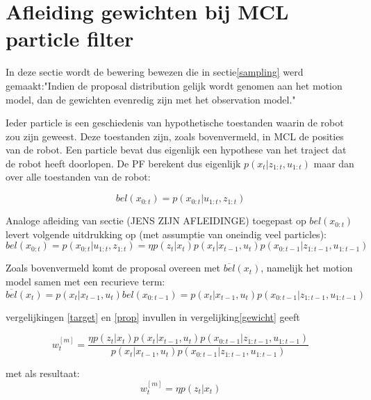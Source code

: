 \documentclass{book}
\begin{document}
\section{Afleiding gewichten bij MCL particle filter}
\label{afleidinge}
In deze sectie wordt de bewering bewezen die in sectie\ref{sampling} werd gemaakt:"Indien de proposal distribution gelijk wordt genomen aan het motion model, dan de gewichten evenredig zijn met het observation model."


Ieder particle is een geschiedenis van hypothetische toestanden waarin de robot zou zijn geweest. Deze toestanden zijn, zoals bovenvermeld, in MCL de posities van de robot. Een particle bevat dus eigenlijk een hypothese van het traject dat de robot heeft doorlopen. De PF berekent dus eigenlijk $p(x_t|z_{1:t},u_{1:t})$ maar dan over alle toestanden van de robot:

\begin{equation}
bel(x_{0:t})= p(x_{0:t}| u_{1:t},z_{1:t})
\end{equation}

Analoge afleiding van sectie (JENS ZIJN AFLEIDINGE) toegepast op $bel(x_{0:t})$ levert volgende uitdrukking op (met assumptie van oneindig veel particles):
\begin{equation}
bel(x_{0:t})= p(x_{0:t}| u_{1:t},z_{1:t}) = \eta p(z_{t}|x_{t}) p(x_{t}|x_{t-1},u_{t}) p(x_{0:t-1}|z_{1:t-1},u_{1:t-1})
\label{target}
\end{equation}

Zoals bovenvermeld komt de proposal overeen met $\overline{bel}(x_{t})$, namelijk het motion model samen met een recurieve term:
\begin{equation}
\overline{bel}(x_{t})=p(x_{t}|x_{t-1},u_{t})bel(x_{0:t-1})=p(x_{t}|x_{t-1},u_{t})p(x_{0:t-1}|z_{1:t-1},u_{1:t-1})
\label{prop}
\end{equation}

vergelijkingen \ref{target} en \ref{prop} invullen in vergelijking\ref{gewicht} geeft

\begin{equation}
w_{t}^{[m]}= \dfrac{\eta p(z_{t}|x_{t}) p(x_{t}|x_{t-1},u_{t}) p(x_{0:t-1}|z_{1:t-1},u_{1:t-1})}{p(x_{t}|x_{t-1},u_{t})p(x_{0:t-1}|z_{1:t-1},u_{1:t-1})}
\end{equation}
 
met als resultaat:
\begin{equation}
w_{t}^{[m]}= \eta p(z_{t}|x_{t})
\label{gewichten}
\end{equation}
\end{document}

